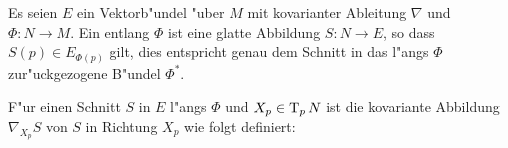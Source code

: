 \begin{Dfn}
  Es seien $E$ ein Vektorb"undel "uber $M$ mit kovarianter Ableitung $\nabla$ und $\Phi: N \to M$.
  Ein  entlang $\Phi$ ist eine glatte Abbildung $S: N \to E$, so dass $S(p) \in E_{\Phi(p)}$ gilt, dies entspricht genau dem Schnitt in das l"angs $\Phi$ zur"uckgezogene B"undel $\Phi^*$.
  \begin{center}\end{center}
\end{Dfn}
F"ur einen Schnitt $S$ in $E$ l"angs $\Phi$ und $X_p \in \operatorname{T}_pN$ ist die kovariante Abbildung $\nabla_{X_p}S$ von $S$ in Richtung $X_p$ wie folgt definiert:

